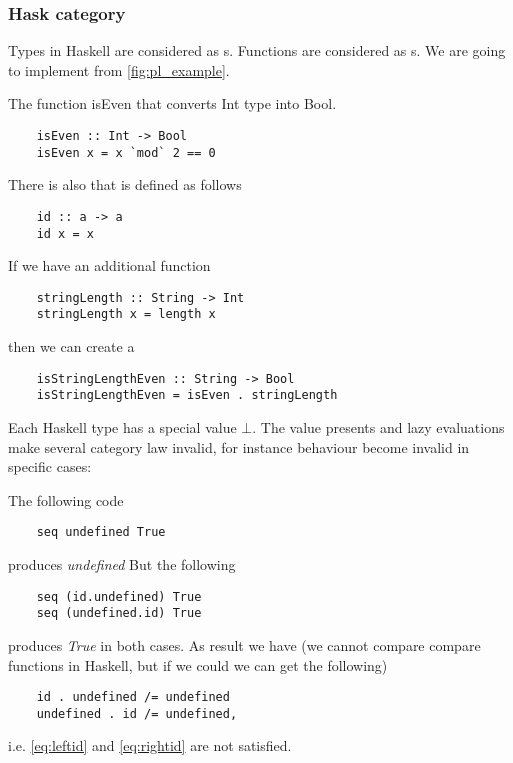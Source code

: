 \subsubsection{\textbf{Hask} category}
\begin{example}
  \label{ex:haskcategory}
  Types in Haskell are considered as s.
  Functions are considered as s.
  We are going to implement  from
  \cref{fig:pl_example}.

  The function isEven that converts Int type
  into Bool.
  \begin{verbatim}
    isEven :: Int -> Bool
    isEven x = x `mod` 2 == 0
  \end{verbatim}

  There is also  that is defined as follows
  \begin{verbatim}
    id :: a -> a
    id x = x
  \end{verbatim}

  If we have an additional function
  \begin{verbatim}
    stringLength :: String -> Int
    stringLength x = length x
  \end{verbatim}
  then we can create a 
  \begin{verbatim}
    isStringLengthEven :: String -> Bool
    isStringLengthEven = isEven . stringLength
  \end{verbatim}

\end{example}

\begin{remark}
  \label{rem:hask_lazy_eval}
  Each Haskell type has a special value $\bot$. The value presents
  and lazy evaluations make several category law invalid, for instance
   behaviour become invalid in specific cases:

  The following code
  \begin{verbatim}
    seq undefined True
  \end{verbatim}
  produces \textit{undefined}
  But the following
  \begin{verbatim}
    seq (id.undefined) True
    seq (undefined.id) True
  \end{verbatim}
  produces \textit{True} in both cases.
  As result we have
  (we cannot compare compare functions in Haskell, but if we
  could we can get the following)
  \begin{verbatim}
    id . undefined /= undefined
    undefined . id /= undefined,
  \end{verbatim}
  i.e. \eqref{eq:leftid} and
  \eqref{eq:rightid} are not satisfied.  
\end{remark}

